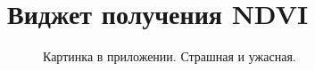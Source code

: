 \chapter{Виджет получения NDVI}
\label{cha:ndvi}

\begin{figure}
	\centering
	\caption{Картинка в приложении. Страшная и ужасная.}
\end{figure}